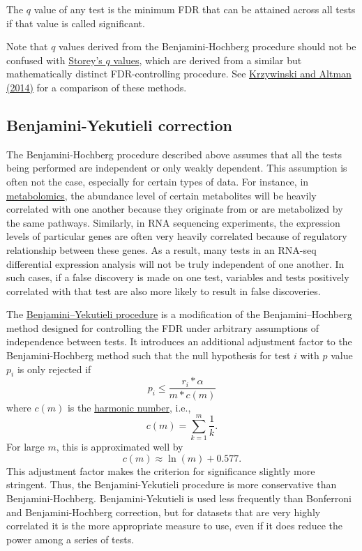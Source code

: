 \documentclass[letterpaper, 12pt]{article}
\begin{document}
The $q$ value of any test is the minimum FDR that can be attained across all tests if that value is called significant.

Note that $q$ values derived from the Benjamini-Hochberg procedure should not be confused with \href{https://doi.org/10.1111/1467-9868.00346}{Storey's $q$ values}, which are derived from a similar but mathematically distinct FDR-controlling procedure. See \href{https://doi.org/10.1038/nmeth.2900}{Krzywinski and Altman (2014)} for a comparison of these methods.

\subsection*{Benjamini-Yekutieli correction}

The Benjamini-Hochberg procedure described above assumes that all the tests being performed are independent or only weakly dependent. This assumption is often not the case, especially for certain types of data. For instance, in \href{https://en.wikipedia.org/wiki/Metabolomics}{metabolomics}, the abundance level of certain metabolites will be heavily correlated with one another because they originate from or are metabolized by the same pathways. Similarly, in RNA sequencing experiments, the expression levels of particular genes are often very heavily correlated because of regulatory relationship between these genes. As a result, many tests in an RNA-seq differential expression analysis will not be truly independent of one another. In such cases, if a false discovery is made on one test, variables and tests positively correlated with that test are also more likely to result in false discoveries.

The \href{https://doi.org/10.1214%2Faos%2F1013699998}{Benjamini–Yekutieli procedure} is a modification of the Benjamini–Hochberg method designed for controlling the FDR under arbitrary assumptions of independence between tests. It introduces an additional adjustment factor to the Benjamini-Hochberg method such that the null hypothesis for test $i$ with $p$ value $p_i$ is only rejected if
$$p_i \leq \frac{r_i * \alpha}{m*c(m)}$$
where $c(m)$ is the \href{https://en.wikipedia.org/wiki/Harmonic_number}{harmonic number}, i.e.,
$$c(m) = \sum_{k=1}^m \frac{1}{k}.$$
For large $m$, this is approximated well by
$$c(m) \approx \ln(m) + 0.577.$$
This adjustment factor makes the criterion for significance slightly more stringent. Thus, the Benjamini-Yekutieli procedure is more conservative than Benjamini-Hochberg. Benjamini-Yekutieli is used less frequently than Bonferroni and Benjamini-Hochberg correction, but for datasets that are very highly correlated it is the more appropriate measure to use, even if it does reduce the power among a series of tests.
\end{document}
